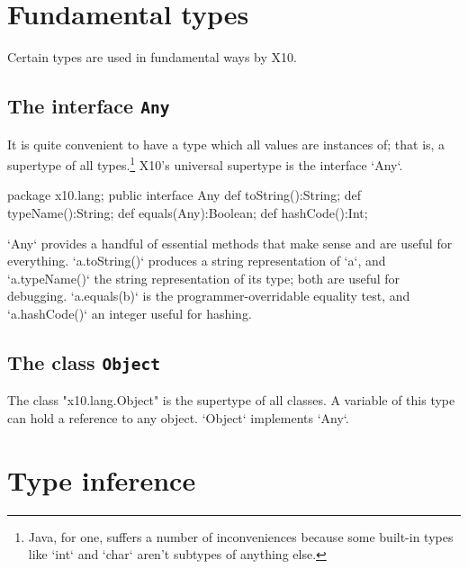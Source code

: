 {\begin{itemize}
\end{itemize}


\section{Fundamental types}

Certain types are used in fundamental ways by X10.  

\subsection{The interface {\tt Any}}

It is quite convenient to have a type which all values are instances of; that
is, a supertype of all types.\footnote{Java, for one, suffers a number of
  inconveniences because some built-in types like \xcd`int` and \xcd`char`
  aren't subtypes of anything else.}  X10's universal supertype is the
  interface \xcd`Any`. 

\begin{xten}
package x10.lang;
public interface Any {
  def toString():String;
  def typeName():String;
  def equals(Any):Boolean;
  def hashCode():Int;
}
\end{xten}

\xcd`Any` provides a handful of essential methods that make sense and are
useful for everything. \xcd`a.toString()` produces a
string representation of \xcd`a`, and \xcd`a.typeName()` the string
representation of its type; both are useful for debugging.  \xcd`a.equals(b)`
is the programmer-overridable equality test, and \xcd`a.hashCode()` an integer
useful for hashing.  


\subsection{The class {\tt Object}}
\label{Object}

The class \xcd"x10.lang.Object" is the supertype of all classes.
A variable of this type can hold a reference to any object.
\xcd`Object` implements \xcd`Any`.



\section{Type inference}
\label{TypeInference}

}
